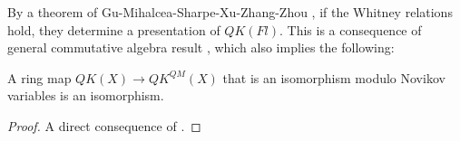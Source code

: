 \documentclass[11pt,letterpaper]{amsart}
\begin{document}
 By a theorem of Gu-Mihalcea-Sharpe-Xu-Zhang-Zhou \cite[Thm 4.1]{nakayama}, if the Whitney relations hold, they determine a presentation of $QK(Fl)$. This is a consequence of general commutative algebra result \cite[Thm 2.7]{nakayama}, which also implies the following:

\begin{thm}
A ring map $QK(X)\to QK^{QM}(X)$ that is an isomorphism modulo Novikov variables is an isomorphism. 
    
\end{thm}
 
\begin{proof}
    A direct consequence of \cite[Thm 2.7]{nakayama}. 
\end{proof}








\end{document}
